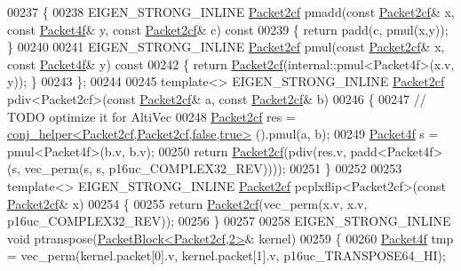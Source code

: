 \begin{DoxyCode}
00237 \{
00238   EIGEN\_STRONG\_INLINE \hyperlink{struct_eigen_1_1internal_1_1_packet2cf}{Packet2cf} pmadd(\textcolor{keyword}{const} \hyperlink{struct_eigen_1_1internal_1_1_packet2cf}{Packet2cf}& x, \textcolor{keyword}{const} 
      \hyperlink{struct_eigen_1_1internal_1_1_packet4f}{Packet4f}& y, \textcolor{keyword}{const} \hyperlink{struct_eigen_1_1internal_1_1_packet2cf}{Packet2cf}& c)\textcolor{keyword}{ const}
00239 \textcolor{keyword}{  }\{ \textcolor{keywordflow}{return} padd(c, pmul(x,y)); \}
00240 
00241   EIGEN\_STRONG\_INLINE \hyperlink{struct_eigen_1_1internal_1_1_packet2cf}{Packet2cf} pmul(\textcolor{keyword}{const} \hyperlink{struct_eigen_1_1internal_1_1_packet2cf}{Packet2cf}& x, \textcolor{keyword}{const} 
      \hyperlink{struct_eigen_1_1internal_1_1_packet4f}{Packet4f}& y)\textcolor{keyword}{ const}
00242 \textcolor{keyword}{  }\{ \textcolor{keywordflow}{return} \hyperlink{struct_eigen_1_1internal_1_1_packet2cf}{Packet2cf}(internal::pmul<Packet4f>(x.v, y)); \}
00243 \};
00244 
00245 \textcolor{keyword}{template}<> EIGEN\_STRONG\_INLINE \hyperlink{struct_eigen_1_1internal_1_1_packet2cf}{Packet2cf} pdiv<Packet2cf>(\textcolor{keyword}{const} 
      \hyperlink{struct_eigen_1_1internal_1_1_packet2cf}{Packet2cf}& a, \textcolor{keyword}{const} \hyperlink{struct_eigen_1_1internal_1_1_packet2cf}{Packet2cf}& b)
00246 \{
00247   \textcolor{comment}{// TODO optimize it for AltiVec}
00248   \hyperlink{struct_eigen_1_1internal_1_1_packet2cf}{Packet2cf} res = \hyperlink{struct_eigen_1_1internal_1_1conj__helper_3_01_packet2cf_00_01_packet2cf_00_01false_00_01true_01_4}{conj\_helper<Packet2cf,Packet2cf,false,true>}
      ().pmul(a, b);
00249   \hyperlink{struct_eigen_1_1internal_1_1_packet4f}{Packet4f} s = pmul<Packet4f>(b.v, b.v);
00250   \textcolor{keywordflow}{return} \hyperlink{struct_eigen_1_1internal_1_1_packet2cf}{Packet2cf}(pdiv(res.v, padd<Packet4f>(s, vec\_perm(s, s, p16uc\_COMPLEX32\_REV))));
00251 \}
00252 
00253 \textcolor{keyword}{template}<> EIGEN\_STRONG\_INLINE \hyperlink{struct_eigen_1_1internal_1_1_packet2cf}{Packet2cf} pcplxflip<Packet2cf>(\textcolor{keyword}{const} 
      \hyperlink{struct_eigen_1_1internal_1_1_packet2cf}{Packet2cf}& x)
00254 \{
00255   \textcolor{keywordflow}{return} \hyperlink{struct_eigen_1_1internal_1_1_packet2cf}{Packet2cf}(vec\_perm(x.v, x.v, p16uc\_COMPLEX32\_REV));
00256 \}
00257 
00258 EIGEN\_STRONG\_INLINE \textcolor{keywordtype}{void} ptranspose(\hyperlink{struct_eigen_1_1internal_1_1_packet_block}{PacketBlock<Packet2cf,2>}& kernel)
00259 \{
00260   \hyperlink{struct_eigen_1_1internal_1_1_packet4f}{Packet4f} tmp = vec\_perm(kernel.packet[0].v, kernel.packet[1].v, p16uc\_TRANSPOSE64\_HI);

\end{DoxyCode}
